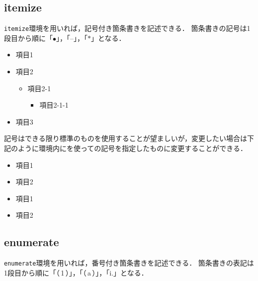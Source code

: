 \documentclass[a4j,11pt]{ujreport}
\begin{document}
\subsection{itemize}
\texttt{itemize}環境を用いれば，記号付き箇条書きを記述できる．
箇条書きの記号は1段目から順に「$\bullet$」，「--」，「$\ast$」となる．

\begin{screen}
\begin{itemize}
\item 項目1
\item 項目2
\begin{itemize}
\item 項目2-1
\begin{itemize}
\item 項目2-1-1
\end{itemize}
\end{itemize}
\item 項目3
\end{itemize}
\end{screen}

記号はできる限り標準のものを使用することが望ましいが，変更したい場合は下記のように環境内にを使っての記号を指定したものに変更することができる．

\begin{minipage}[t]{0.7\hsize}
\begin{code}
\begin{itemize}
    \renewcommand{\labelitemi}{■}
    \item 項目1
    \item 項目2
\end{itemize}
\end{code}
\end{minipage}
\quad
\begin{minipage}[t]{0.25\hsize}
\begin{screen}
\begin{itemize}
\renewcommand{\labelitemi}{■}
\item 項目1
\item 項目2
\end{itemize}
\end{screen}
\end{minipage}

\subsection{enumerate}
\texttt{enumerate}環境を用いれば，番号付き箇条書きを記述できる．
箇条書きの表記は1段目から順に「（\,1\,）」，「（\,a\,）」，「i.」となる．
\end{document}
